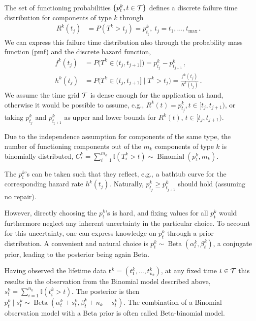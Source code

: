 \documentclass[authoryear, 12pt, a4paper]{elsarticle}
\newcommand{\bs}[1]{\boldsymbol{#1}}
\renewcommand{\vec}[1]{{\bs#1}}
\newcommand{\indic}{\mathbb{I}}
\newcommand{\bin}{\operatorname{Binomial}}
\newcommand{\be}{\operatorname{Beta}}
\def\tmax{t_\text{max}}
\newcommand{\ptk}{p^k_t}
\newcommand{\td}[1]{%
  \iftoggle{td}{%
    \todo[inline]{#1}%
  }{}%
}
\begin{document}
The set of functioning probabilities $\{ \ptk, t \in {\cal T}\}$
defines a discrete failure time distribution for components of type $k$ through
\begin{align*}
R^k(t_j) &= P(T^k > t_j) = p^k_{t_j},\ t_j = t_1, \ldots, \tmax\,.
\end{align*}
We can express this failure time distribution also through the probability mass function (pmf) and the discrete hazard function,
\begin{align*}
f^k(t_j) &= P\big(T^k \in (t_j,t_{j+1}]\big) = p^k_{t_j} - p^k_{t_{j+1}}\,,\\ 
h^k(t_j) &= P\big(T^k \in (t_j,t_{j+1}]\mid T^k > t_j\big) = \frac{f^k(t_j)}{R^k(t_j)}\,. %
\end{align*}
We assume the time grid $\cal T$ is dense enough for the application at hand,
otherwise it would be possible to assume, e.g.,
$R^k(t) = p^k_{t_j}, t \in [t_j, t_{j+1})$,
or taking $p^k_{t_j}$ and $p^k_{t_{j+1}}$ as upper and lower bounds for $R^k(t)$, $t \in [t_j, t_{j+1})$.

\td{***illustrate discrete distribution with a graph of R, q, h?***}

Due to the independence assumption for components of the same type, 
the number of functioning components out of the $m_k$ components of type $k$
is binomially distributed, $C^k_t = \sum_{i=1}^{m_k} \indic(T^k_i > t) \sim \bin(\ptk, m_k)$.

The $\ptk$'s can be taken such that they reflect, e.g., a bathtub curve for the corresponding hazard rate $h^k(t_j)$.
Naturally, $p^k_{t_j} \ge p^k_{t_{j+1}}$ should hold (assuming no repair).

However, directly choosing the $\ptk$'s is hard,
and fixing values for all $p^k_t$ would furthermore neglect any inherent uncertainty in the particular choice.  
To account for this uncertainty, one can express knowledge on $\ptk$ through a prior distribution.
A convenient and natural choice is $\ptk \sim \be(\alpha^k_t, \beta^k_t)$, a conjugate prior,
leading to the posterior being again Beta.

Having observed the lifetime data $\vec{t}^k = (t^k_1, \ldots, t^k_{n_k})$,
at any fixed time $t \in {\cal T}$ this results in the observation from the Binomial model described above,
$s^k_t = \sum_{i=1}^{n_k} \indic(t^k_i > t)$.
The posterior is then $\ptk \mid s^k_t \sim \be(\alpha^k_t + s^k_t, \beta^k_t + n_k - s^k_t)$.
The combination of a Binomial observation model with a Beta prior is often called Beta-binomial model.
\end{document}
